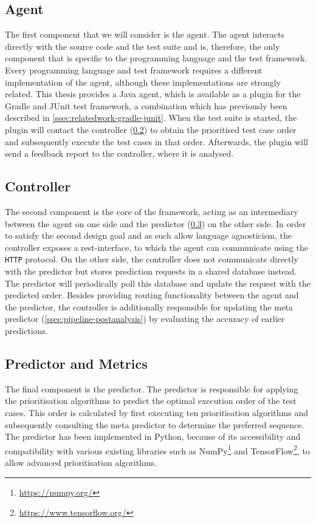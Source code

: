 \subsection{Agent}
\label{ssec:velocity-frontend}
The first component that we will consider is the agent. The agent interacts directly with the source code and the test suite and is, therefore, the only component that is specific to the programming language and the test framework. Every programming language and test framework requires a different implementation of the agent, although these implementations are strongly related. This thesis provides a Java agent, which is available as a plugin for the Gradle and JUnit test framework, a combination which has previously been described in \cref{ssec:relatedwork-gradle-junit}. When the test suite is started, the plugin will contact the controller (\cref{ssec:velocity-controller}) to obtain the prioritised test case order and subsequently execute the test cases in that order. Afterwards, the plugin will send a feedback report to the controller, where it is analysed.

\subsection{Controller}\label{ssec:velocity-controller}
The second component is the core of the framework, acting as an intermediary between the agent on one side and the predictor (\cref{ssec:velocity-predictor}) on the other side. In order to satisfy the second design goal and as such allow language agnosticism, the controller exposes a \Gls{rest}-interface, to which the agent can communicate using the \texttt{HTTP} protocol. On the other side, the controller does not communicate directly with the predictor but stores prediction requests in a shared database instead. The predictor will periodically poll this database and update the request with the predicted order. Besides providing routing functionality between the agent and the predictor, the controller is additionally responsible for updating the meta predictor (\cref{ssec:pipeline-postanalysis}) by evaluating the accuracy of earlier predictions.

\subsection{Predictor and Metrics}\label{ssec:velocity-predictor}
The final component is the predictor. The predictor is responsible for applying the prioritisation algorithms to predict the optimal execution order of the test cases. This order is calculated by first executing ten prioritisation algorithms and subsequently consulting the meta predictor to determine the preferred sequence. The predictor has been implemented in Python, because of its accessibility and compatibility with various existing libraries such as NumPy\footnote{\url{https://numpy.org/}} and TensorFlow\footnote{\url{https://www.tensorflow.org/}}, to allow advanced prioritisation algorithms. 